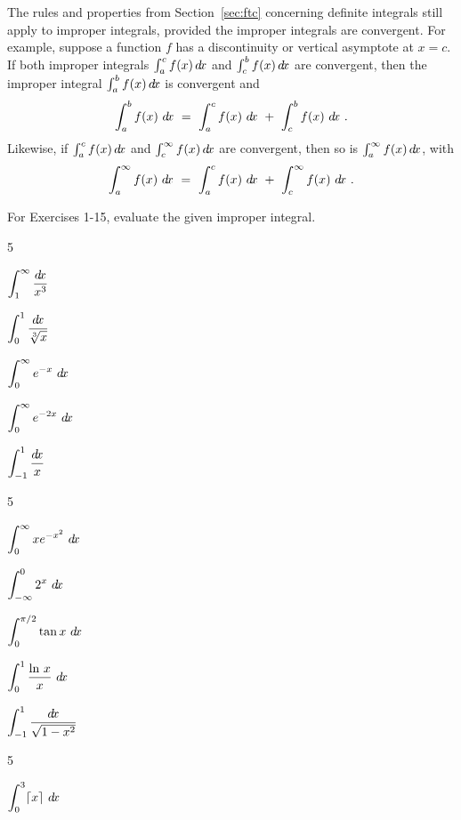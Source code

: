 The rules and properties from Section~\ref{sec:ftc} concerning definite integrals still
apply to improper integrals, provided the improper integrals are convergent.
For example, suppose a function $f$ has a discontinuity or vertical asymptote at
$x=c$. If both improper integrals $\int_a^{c} f(x)\,d\!x$ and
$\int_c^{b} f(x)\,d\!x$ are convergent, then the improper integral
$\int_a^{b} f(x)\,d\!x$ is convergent and
\[
\int_a^{b} f(x)~d\!x ~=~ \int_a^{c} f(x)~d\!x ~+~ \int_c^{b} f(x)~d\!x ~.
\]
Likewise, if $\int_a^{c} f(x)\,d\!x$ and $\int_c^{\infty} f(x)\,d\!x$ are
convergent, then so is $\int_a^{\infty} f(x)\,d\!x$, with
\[
\int_a^{\infty} f(x)~d\!x ~=~ \int_a^{c} f(x)~d\!x ~+~ \int_c^{\infty} f(x)~d\!x ~.
\]
\newpage
\startexercises\label{sec5dot5}
{\small
{}
\par\noindent For Exercises 1-15, evaluate the given improper integral.
\begin{enumerate}[\bfseries 1.]
\begin{multicols}{5}
 \item $\displaystyle\int_{1}^{\infty} \frac{\dx}{x^3}\vphantom{\displaystyle\int_{0}^{1}\frac{\dx}{\sqrt[3]{x}}}$
 \item $\displaystyle\int_{0}^{1} \frac{d\!x}{\sqrt[3]{x}}$
 \item $\displaystyle\int_{0}^{\infty} e^{-x} ~\dx\vphantom{\displaystyle\int_{0}^{1}\frac{\dx}{\sqrt[3]{x}}}$
 \item $\displaystyle\int_{0}^{\infty} e^{-2x} ~\dx\vphantom{\displaystyle\int_{0}^{1}\frac{\dx}{\sqrt[3]{x}}}$
 \item $\displaystyle\int_{-1}^{1} \frac{\dx}{x}\vphantom{\displaystyle\int_{0}^{1}\frac{\dx}{\sqrt[3]{x}}}$
\end{multicols}
\begin{multicols}{5}
 \item $\displaystyle\int_{0}^{\infty} x e^{-x^2}~\dx\vphantom{\displaystyle\int_{0}^{\pi/2}}$
 \item $\displaystyle\int_{-\infty}^{0} 2^x ~\dx\vphantom{\displaystyle\int_{0}^{\pi/2}}$
 \item $\displaystyle\int_{0}^{\pi/2} \tan x ~d\!x$
 \item $\displaystyle\int_{0}^{1} \frac{\ln\,x}{x}~\dx\vphantom{\displaystyle\int_{0}^{\pi/2}}$
 \item $\displaystyle\int_{-1}^{1} \frac{\dx}{\sqrt{1 - x^2}}\vphantom{\displaystyle\int_{0}^{\pi/2}}$
\end{multicols}
\begin{multicols}{5}
 \item $\displaystyle\int_{0}^{3} \lceil x \rceil ~\dx\vphantom{\displaystyle\int_{0}^{1} \frac{\dx}{(x - 1)^3}}$

\end{multicols}
\end{enumerate}}
